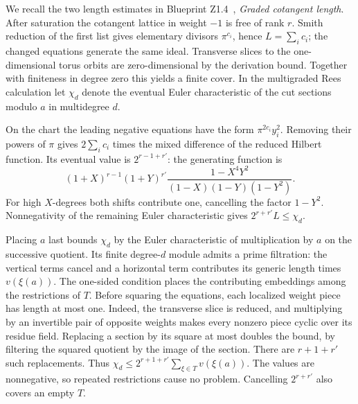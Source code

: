 \begin{outline}
We recall the two length estimates in Blueprint Z1.4~, \emph{Graded
cotangent length}. After saturation the cotangent lattice in weight
\(-1\) is free of rank \(r\). Smith reduction of the first list gives
elementary divisors \(\pi^{c_i}\), hence \(L=\sum_i c_i\); the changed
equations generate the same ideal. Transverse slices to the
one-dimensional torus orbits are zero-dimensional by the derivation
bound. Together with finiteness in degree zero this yields a finite cover.
In the multigraded Rees calculation let \(\chi_d\) denote the eventual
Euler characteristic of the cut sections modulo \(a\) in multidegree \(d\).

On the chart the leading negative equations have the form
\(\pi^{2c_i}y_i^2\). Removing their powers of \(\pi\) gives
\(2\sum_i c_i\) times the mixed difference of the reduced Hilbert
function. Its eventual value is \(2^{r-1+r'}\): the generating
function is
\[
 (1+X)^{r-1}(1+Y)^{r'}\frac{1-X^4Y^2}{(1-X)(1-Y)(1-Y^2)}.
\]
For high \(X\)-degrees both shifts contribute one, cancelling the
factor \(1-Y^2\). Nonnegativity of the remaining Euler characteristic
gives \(2^{r+r'}L\le\chi_d\).

Placing \(a\) last bounds \(\chi_d\) by the Euler characteristic of
multiplication by \(a\) on the successive quotient. Its finite
degree-\(d\) module admits a prime filtration: the vertical terms
cancel and a horizontal term contributes its generic length times
\(v(\xi(a))\). The one-sided condition places the contributing
embeddings among the restrictions of \(T\). Before squaring the
equations, each localized weight piece has length at most one.
Indeed, the transverse slice is reduced, and multiplying by an
invertible pair of opposite weights makes every nonzero piece cyclic
over its residue field. Replacing a section by its square at most
doubles the bound, by filtering the squared quotient by the image of
the section. There are \(r+1+r'\) such replacements. Thus
\(\chi_d\le 2^{r+1+r'}\sum_{\xi\in T}v(\xi(a))\).
The values are nonnegative, so repeated restrictions cause no problem.
Cancelling \(2^{r+r'}\) also covers an empty \(T\).
\end{outline}
